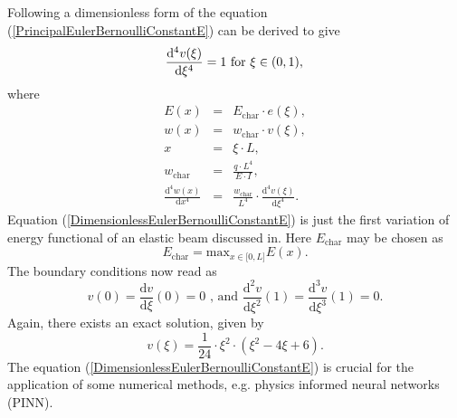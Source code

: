 \documentclass[a4paper,11pt]{article}
\begin{document}
Following \cite[pp. 3]{hoffmann2014modellierung} a dimensionless form of the equation (\ref{PrincipalEulerBernoulliConstantE}) can be derived to give
\begin{equation} \label{DimensionlessEulerBernoulliConstantE}
\frac{\mathrm{d}^4 v(\xi)}{\mathrm{d}\xi^4} = 1 \text{ for } \xi \in (0,1),\\
\end{equation}
where
\begin{eqnarray*}
E (x) &=& E_{\mathrm{char}} \cdot e(\xi ) , \\
w(x) &=& w_{\mathrm{char}} \cdot v(\xi ) , \\
x &=& \xi\cdot L, \\
w_{\mathrm{char}} & = & \frac{q\cdot L^4}{E\cdot I }, \\
\frac{\mathrm{d}^4 w(x)}{\mathrm{d}x^4} & = & \frac{w_{\mathrm{char}}}{L^4}\cdot \frac{\mathrm{d}^4 v(\xi)}{\mathrm{d}\xi^4}.
\end{eqnarray*}
Equation (\ref{DimensionlessEulerBernoulliConstantE}) is just the first variation of energy functional of an elastic beam discussed in\cite[p. 166]{eck2008modellierung}.
Here $E_{\mathrm{char}} $ may be chosen as 
\begin{equation*}
E_{\mathrm{char}} = \mathrm{max}_{x\in \lbrack 0,L \rbrack } E(x) .
\end{equation*}
The boundary conditions now read as
\begin{equation} \label{DimensionlessBoundaryConditions}
v( 0) = \frac{\mathrm{d} v}{\mathrm{d}\xi }(0) = 0 \text{ , and } \frac{\mathrm{d}^2 v}{\mathrm{d}\xi^2}(1) = \frac{\mathrm{d}^3 v}{\mathrm{d}\xi^3}(1) = 0.
\end{equation}
Again, there exists an exact solution, given by
\begin{equation*} 
v(\xi ) = \frac{1}{24} \cdot \xi^2 \cdot \left( \xi^2 -4 \xi + 6 \right) .
\end{equation*}
The equation (\ref{DimensionlessEulerBernoulliConstantE}) is crucial for the application of some numerical methods, e.g. physics informed neural networks (PINN).
\end{document}
